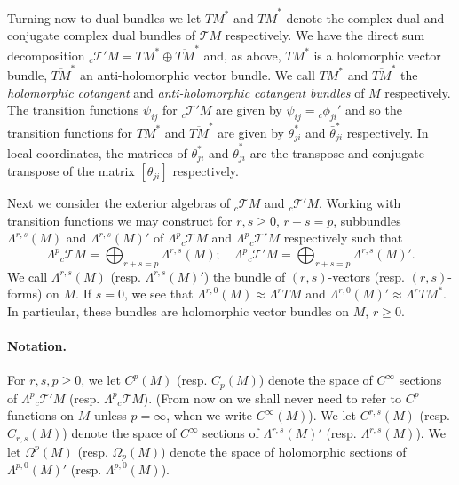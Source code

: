 Turning now to dual bundles we let $TM^*$ and $\overline{TM}^*$ denote the complex dual and conjugate complex dual bundles of $\mathcal TM$ respectively. We have the direct sum decomposition ${}_c\mathcal T'M=TM^*\oplus\overline{TM}^*$ and, as above, $TM^*$ is a holomorphic vector bundle, $\overline{TM}^*$ an anti-holomorphic vector
bundle. We call $TM^*$ and $\overline{TM}^*$ the \emph{holomorphic cotangent} and \emph{anti-holomorphic cotangent bundles} of $M$ respectively. The transition functions $\psi_{ij}$ for ${}_c\mathcal T'M$ are given by $\psi_{ij}={}_c\phi_{ji}'$ and so the transition functions for $TM^*$ and $\overline{TM}^*$ are given by $\theta_{ji}^*$ and $\bar\theta_{ji}^*$ respectively. In local coordinates, the matrices of $\theta_{ji}^*$ and $\bar\theta_{ji}^*$ are the transpose and conjugate transpose of the matrix $[\theta_{ji}]$ respectively.

Next we consider the exterior algebras of ${}_c\mathcal TM$ and ${}_c\mathcal T'M$. Working with transition functions we may construct for $r,s\geq0$, $r+s=p$, subbundles $\Lambda^{r,s}(M)$ and $\Lambda^{r,s}(M)'$ of $\Lambda^p{}_c\mathcal TM$ and $\Lambda^p{}_c\mathcal T'M$ respectively such that
\[\Lambda^p{}_c\mathcal TM=\bigoplus_{r+s=p}\Lambda^{r,s}(M);\quad\Lambda^p{}_c\mathcal T'M=\bigoplus_{r+s=p}\Lambda^{r,s}(M)'.\]
We call $\Lambda^{r,s}(M)$ (resp. $\Lambda^{r,s}(M)'$) the bundle of $(r,s)$-vectors (resp. $(r,s)$-forms) on $M$. If $s=0$, we see that $\Lambda^{r,0}(M)\approx\Lambda^rTM$ and $\Lambda^{r,0}(M)'\approx\Lambda^rTM^*$. In particular, these bundles are holomorphic vector bundles on $M$, $r\geq0$.

\paragraph{Notation.} For $r,s,p\geq0$, we let $C^p(M)$ (resp. $C_p(M)$) denote the space of $C^\infty$ sections of $\Lambda^p{}_c\mathcal T'M$ (resp. $\Lambda^p{}_c\mathcal TM$). (From now on we shall never need to refer to $C^p$ functions on $M$ unless $p=\infty$, when we write $C^\infty(M)$). We let $C^{r,s}(M)$ (resp. $C_{r,s}(M)$) denote the space of $C^\infty$ sections of $\Lambda^{r,s}(M)'$ (resp. $\Lambda^{r,s}(M)$). We let $\Omega^p(M)$ (resp. $\Omega_p(M)$) denote the space of holomorphic sections of $\Lambda^{p,0}(M)'$ (resp. $\Lambda^{p,0}(M)$).

